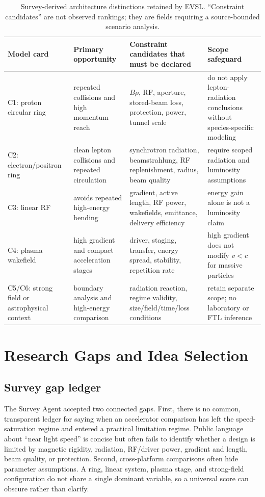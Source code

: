 \documentclass[conference]{../../../../Conference-LaTeX-template_10-17-19/IEEEtran}
\begin{document}
\begin{table}[!t]
\caption{Survey-derived architecture distinctions retained by EVSL. ``Constraint candidates'' are not observed rankings; they are fields requiring a source-bounded scenario analysis.}
\label{tab:architectures}
\centering
\small
\begin{tabularx}{\textwidth}{lYYY}
\toprule
Model card & Primary opportunity & Constraint candidates that must be declared & Scope safeguard \\
\midrule
C1: proton circular ring & repeated collisions and high momentum reach & $B\rho$, RF, aperture, stored-beam loss, protection, power, tunnel scale & do not apply lepton-radiation conclusions without species-specific modeling \\
C2: electron/positron ring & clean lepton collisions and repeated circulation & synchrotron radiation, beamstrahlung, RF replenishment, radius, beam quality & require scoped radiation and luminosity assumptions \\
C3: linear RF & avoids repeated high-energy bending & gradient, active length, RF power, wakefields, emittance, delivery efficiency & energy gain alone is not a luminosity claim \\
C4: plasma wakefield & high gradient and compact acceleration stages & driver, staging, transfer, energy spread, stability, repetition rate & high gradient does not modify $v<c$ for massive particles \\
C5/C6: strong field or astrophysical context & boundary analysis and high-energy comparison & radiation reaction, regime validity, size/field/time/loss conditions & retain separate scope; no laboratory or FTL inference \\
\bottomrule
\end{tabularx}
\end{table}

\section{Research Gaps and Idea Selection}
\subsection{Survey gap ledger}
The Survey Agent accepted two connected gaps. First, there is no common, transparent ledger for saying when an accelerator comparison has left the speed-saturation regime and entered a practical limitation regime. Public language about ``near light speed'' is concise but often fails to identify whether a design is limited by magnetic rigidity, radiation, RF/driver power, gradient and length, beam quality, or protection. Second, cross-platform comparisons often hide parameter assumptions. A ring, linear system, plasma stage, and strong-field configuration do not share a single dominant variable, so a universal score can obscure rather than clarify.
\end{document}
